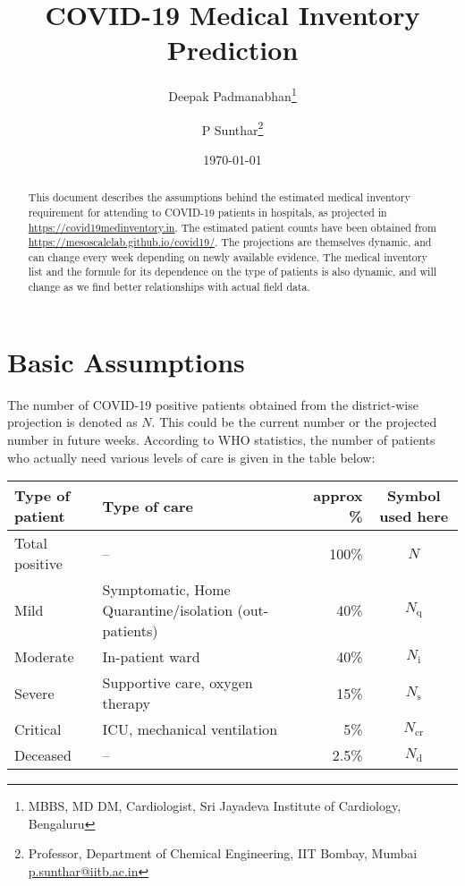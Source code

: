 \documentclass{article}
\newcommand{\email}[1]{\href{mailto:#1}{#1}}
\newcommand{\nd}{\ensuremath{N_{\mathrm{d}}}}
\newcommand{\ncr}{\ensuremath{N_{\mathrm{cr}}}}
\newcommand{\ns}{\ensuremath{N_{\mathrm{s}}}}
\newcommand{\nin}{\ensuremath{N_{\mathrm{i}}}}
\newcommand{\nq}{\ensuremath{N_{\mathrm{q}}}}
\begin{document}
\title{COVID-19 Medical Inventory Prediction}
\date{\today}
\author{Deepak Padmanabhan\thanks{MBBS, MD DM, Cardiologist, Sri Jayadeva
    Institute of Cardiology, Bengaluru}
  \and
  P Sunthar\thanks{Professor, Department of Chemical Engineering, IIT
    Bombay, Mumbai \email{p.sunthar@iitb.ac.in}}
}
\maketitle
\begin{abstract}
  This document describes the assumptions behind the estimated medical
  inventory requirement for attending to COVID-19 patients in
  hospitals, as projected in \url{https://covid19medinventory.in}. The
  estimated patient counts have been obtained from
  \url{https://mesoscalelab.github.io/covid19/}. The projections are
  themselves dynamic, and can change every week depending on newly
  available evidence. The medical inventory list and the formule for
  its dependence on the type of patients is also dynamic, and will
  change as we find better relationships with actual field data.
\end{abstract}

\section{Basic Assumptions}

The number of COVID-19 positive patients obtained from the
district-wise projection\cite{ansualok20} is denoted as $N$. This could
be the current number or the projected number in future weeks.
According to WHO statistics\cite{who19mar}, the number of patients who
actually need various levels of care \cite{aiims2020a} is given in the
table below:

\noindent
\begin{tabularx}{\linewidth}{XXrc}
  \toprule
  Type of patient & Type of care & approx \% & Symbol used here \\
  \midrule
  Total positive & -- & 100\% & $N$ \\
  Mild & Symptomatic, Home Quarantine/isolation (out-patients) & 40\% & \nq \\
  Moderate & In-patient ward & 40\% & \nin \\
  Severe & Supportive care, oxygen therapy   & 15\% & \ns \\
  Critical & ICU, mechanical ventilation & 5\% & \ncr \\
  Deceased & --  & 2.5\% & \nd \\
\bottomrule  
\end{tabularx}
\end{document}
